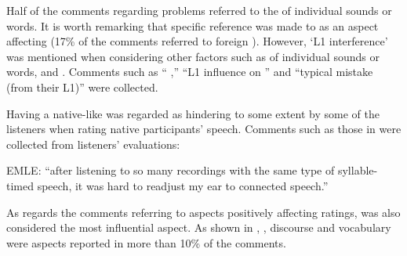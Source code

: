 \documentclass[output=paper]{langsci/langscibook}
\begin{document}
Half of the comments regarding  problems referred to the  of individual sounds or words. It is worth remarking that specific reference was made to  as an aspect affecting  (17\% of the comments referred to foreign ). However, ‘L1 interference’ was mentioned when considering other  factors such as  of individual sounds or words, and . Comments such as “ ,” “L1 influence on ” and “typical  mistake (from their L1)” were collected.

Having a native-like  was regarded as hindering  to some extent by some of the listeners when rating native participants’ speech. Comments such as those in  were collected from listeners’ evaluations: 

\ea\label{ex:delrio:1}
EMLE: “after listening to so many recordings with the same type of syllable-timed speech, it was hard to readjust my ear to connected speech.”~
\z

As regards the comments referring to aspects positively affecting  ratings,  was also considered the most influential aspect. As shown in , , discourse and vocabulary were aspects reported in more than 10\% of the comments.
\end{document}
